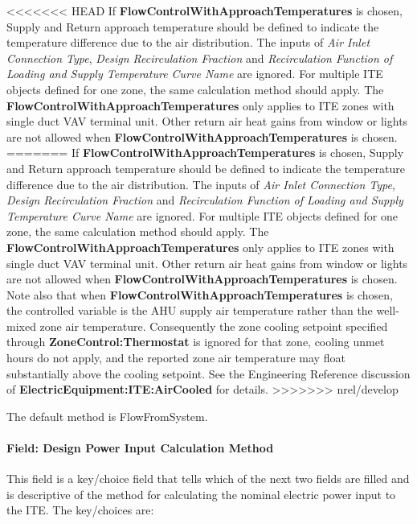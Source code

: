 <<<<<<< HEAD
If \textbf{FlowControlWithApproachTemperatures} is chosen, Supply and Return approach temperature should be defined to indicate the temperature difference due to the air distribution. The inputs of \textit{Air Inlet Connection Type}, \textit{Design Recirculation Fraction} and \textit{Recirculation Function of Loading and Supply Temperature Curve Name} are ignored. For multiple ITE objects defined for one zone, the same calculation method should apply. The \textbf{FlowControlWithApproachTemperatures} only applies to ITE zones with single duct VAV terminal unit. Other return air heat gains from window or lights are not allowed when \textbf{FlowControlWithApproachTemperatures} is chosen.
=======
If \textbf{FlowControlWithApproachTemperatures} is chosen, Supply and Return approach temperature should be defined to indicate the temperature difference due to the air distribution. The inputs of \textit{Air Inlet Connection Type}, \textit{Design Recirculation Fraction} and \textit{Recirculation Function of Loading and Supply Temperature Curve Name} are ignored. For multiple ITE objects defined for one zone, the same calculation method should apply. The \textbf{FlowControlWithApproachTemperatures} only applies to ITE zones with single duct VAV terminal unit. Other return air heat gains from window or lights are not allowed when \textbf{FlowControlWithApproachTemperatures} is chosen. Note also that when \textbf{FlowControlWithApproachTemperatures} is chosen, the controlled variable is the AHU supply air temperature rather than the well-mixed zone air temperature. Consequently the zone cooling setpoint specified through \textbf{ZoneControl:Thermostat} is ignored for that zone, cooling unmet hours do not apply, and the reported zone air temperature may float substantially above the cooling setpoint. See the Engineering Reference discussion of \textbf{ElectricEquipment:ITE:AirCooled} for details.
>>>>>>> nrel/develop

The default method is FlowFromSystem.

\paragraph{Field: Design Power Input Calculation Method}\label{field-design-power-input-calculation-method}

This field is a key/choice field that tells which of the next two fields are filled and is descriptive of the method for calculating the nominal electric power input to the ITE. The key/choices are:


